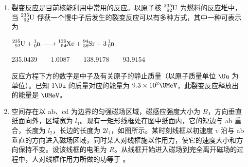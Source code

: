 \documentclass[\gkver]{gaokaozhenti}
\begin{document}
\begin{enumerate}
{先开动 $P_{3}$ 适当时间，再开动 $P_{2}$ 适当时间}
{开动 $P_{4}$ 适当时间}
{先开动 $P_{3}$ 适当时间，再开动 $P_{4}$ 适当时间}


\item
裂变反应是目前核能利用中常用的反应。以原子核 $\ce{^{235}_{92}U}$ 为燃料的反应堆中，当 $\ce{^{235}_{92}U}$ 俘获一个慢中子后发生的裂变反应可以有多种方式，其中一种可表示为

$\ce{^{235}_{92}U + ^{1}_{0}n -> ^{139}_{54}Xe + ^{94}_{38}Sr + 3^{1}_{0}n}$

$235.0439 \qquad 1.0087 \qquad 138.9178 \qquad 93.9154$

反应方程下方的数字是中子及有关原子的静止质量（以原子质量单位 $\Uu$ 为单位）。已知 $1\Uu$ 的质量对应的能量为 $9.3\times10^{2}\UMeV$，此裂变反应释放出的能量是  $\UMeV$。



\item
空间存在以 ab、cd 为边界的匀强磁场区域，磁感应强度大小为 $B$，方向垂直纸面向外，区域宽为 $l_{1}$。现有一矩形线框处在图中纸面内，它的短边与 ab 重合，长度为 $l_{2}$，长边的长度为 $2l_{1}$，如图所示。某时刻线框以初速度 $v$ 沿与 ab 垂直的方向进入磁场区域，同时某人对线框施以作用力，使它的速度大小和方向保持不变。设该线框的电阻为 $R$。从线框开始进入磁场到完全离开磁场的过程中，人对线框作用力所做的功等于 。


\end{enumerate}
\end{document}
